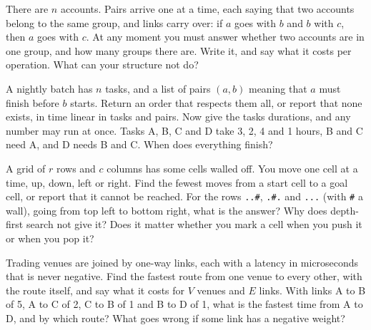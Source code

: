 \begin{question}\label{iq:iv3:algorithms:31}
There are $n$ accounts. Pairs arrive one at a time, each saying that two accounts belong to the same group, and links carry over: if $a$ goes with $b$ and $b$ with $c$, then $a$ goes with $c$. At any moment you must answer whether two accounts are in one group, and how many groups there are. Write it, and say what it costs per operation. What can your structure not do?
\end{question}

\begin{question}\label{iq:iv3:algorithms:32}
A nightly batch has $n$ tasks, and a list of pairs $(a, b)$ meaning that $a$ must finish before $b$ starts. Return an order that respects them all, or report that none exists, in time linear in tasks and pairs. Now give the tasks durations, and any number may run at once. Tasks A, B, C and D take 3, 2, 4 and 1 hours, B and C need A, and D needs B and C. When does everything finish?
\end{question}

\begin{question}\label{iq:iv3:algorithms:33}
A grid of $r$ rows and $c$ columns has some cells walled off. You move one cell at a time, up, down, left or right. Find the fewest moves from a start cell to a goal cell, or report that it cannot be reached. For the rows \texttt{.{}.\#}, \texttt{.\#.} and \texttt{.{}.{}.} (with \texttt{\#} a wall), going from top left to bottom right, what is the answer? Why does depth-first search not give it? Does it matter whether you mark a cell when you push it or when you pop it?
\end{question}

\begin{question}\label{iq:iv3:algorithms:34}
Trading venues are joined by one-way links, each with a latency in microseconds that is never negative. Find the fastest route from one venue to every other, with the route itself, and say what it costs for $V$ venues and $E$ links. With links A to B of 5, A to C of 2, C to B of 1 and B to D of 1, what is the fastest time from A to D, and by which route? What goes wrong if some link has a negative weight?
\end{question}

